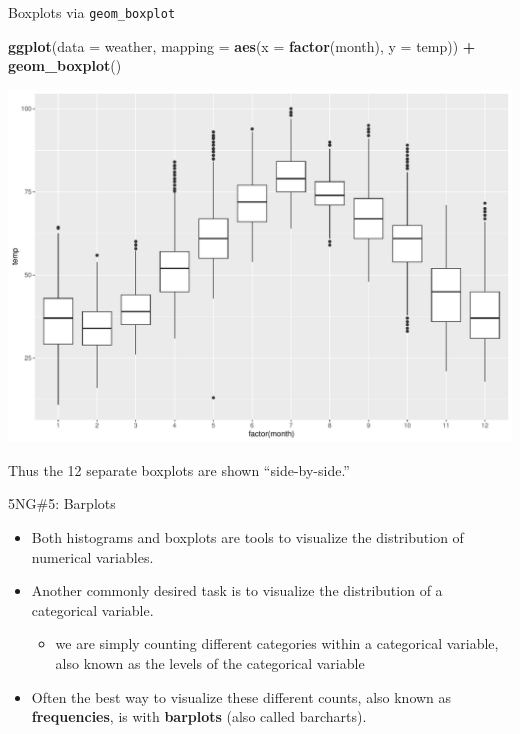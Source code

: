 \documentclass[
  ignorenonframetext,
]{beamer}
\newenvironment{Shaded}{\begin{snugshade}}{\end{snugshade}}
\newcommand{\AttributeTok}[1]{\textcolor[rgb]{0.13,0.29,0.53}{#1}}
\newcommand{\FunctionTok}[1]{\textcolor[rgb]{0.13,0.29,0.53}{\textbf{#1}}}
\newcommand{\NormalTok}[1]{#1}
\newcommand{\SpecialCharTok}[1]{\textcolor[rgb]{0.81,0.36,0.00}{\textbf{#1}}}
\providecommand{\tightlist}{%
  \setlength{\itemsep}{0pt}\setlength{\parskip}{0pt}}
\begin{document}
\begin{frame}[fragile]{Boxplots via \texttt{geom\_boxplot}}
\protect\hypertarget{boxplots-via-geom_boxplot}{}
\tiny

\begin{Shaded}
\begin{Highlighting}[]
\FunctionTok{ggplot}\NormalTok{(}\AttributeTok{data =}\NormalTok{ weather, }\AttributeTok{mapping =} \FunctionTok{aes}\NormalTok{(}\AttributeTok{x =} \FunctionTok{factor}\NormalTok{(month), }\AttributeTok{y =}\NormalTok{ temp)) }\SpecialCharTok{+}
  \FunctionTok{geom\_boxplot}\NormalTok{()}
\end{Highlighting}
\end{Shaded}

\begin{center}\includegraphics[width=0.9\linewidth,height=0.5\textheight]{Week2_Lect_files/figure-beamer/unnamed-chunk-35-1} \end{center}
\normalsize

Thus the 12 separate boxplots are shown ``side-by-side.''
\end{frame}

\begin{frame}{5NG\#5: Barplots}
\protect\hypertarget{ng5-barplots}{}
\begin{itemize}
\item
  Both histograms and boxplots are tools to visualize the distribution
  of numerical variables.
\item
  Another commonly desired task is to visualize the distribution of a
  categorical variable.

  \begin{itemize}
  \tightlist
  \item
    we are simply counting different categories within a categorical
    variable, also known as the levels of the categorical variable
  \end{itemize}
\item
  Often the best way to visualize these different counts, also known as
  \textbf{frequencies}, is with \textbf{barplots} (also called
  barcharts).
\end{itemize}
\end{frame}
\end{document}
